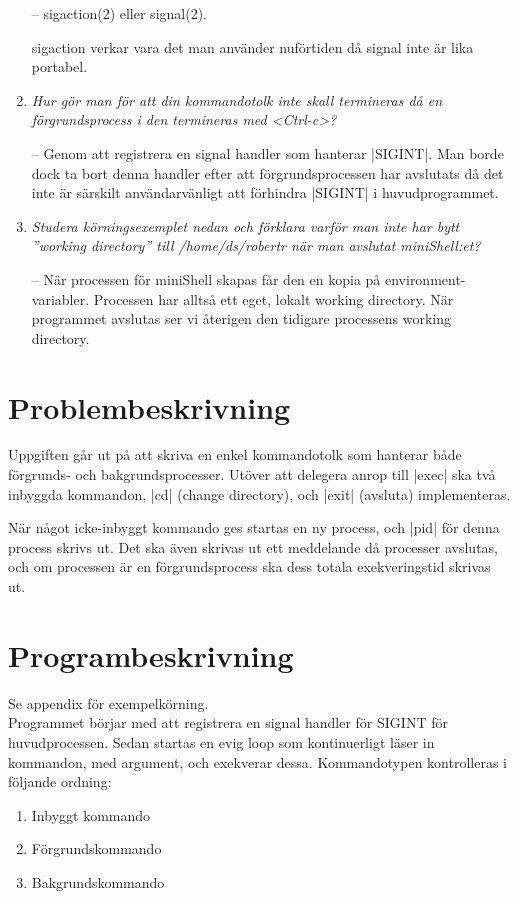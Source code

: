 \documentclass[paper=a4, fontsize=11pt]{scrartcl} %
\numberwithin{equation}{section} %
\numberwithin{figure}{section} %
\numberwithin{table}{section} %
\begin{document}
\begin{enumerate}[1)]
-- sigaction(2) eller signal(2).

sigaction verkar vara det man använder nuförtiden då signal inte är lika portabel.

\item
\emph{Hur gör man för att din kommandotolk inte skall termineras 
då en förgrundsprocess i den termineras med <Ctrl-c>?}

-- Genom att registrera en signal handler som hanterar |SIGINT|. 
Man borde dock ta bort denna handler efter att förgrundsprocessen har avslutats
då det inte är särskilt användarvänligt att förhindra |SIGINT| i huvudprogrammet.

\item
\emph{Studera körningsexemplet nedan och förklara varför man inte har bytt 
''working directory'' till /home/ds/robertr när man avslutat miniShell:et?}

-- När processen för miniShell skapas får den en kopia på environment-variabler. Processen har alltså ett eget, lokalt 
working directory. När programmet avslutas ser vi återigen den tidigare processens working directory.

\end{enumerate}

\section{Problembeskrivning}

Uppgiften går ut på att skriva en enkel kommandotolk 
som hanterar både förgrunds- och bakgrundsprocesser.
Utöver att delegera anrop till |exec| ska två inbyggda kommandon,
 |cd| (change directory), och |exit| (avsluta) implementeras.

När något icke-inbyggt kommando ges startas en ny process, och |pid| för denna process skrivs ut.
Det ska även skrivas ut ett meddelande då processer avslutas, och om processen är en förgrundsprocess ska dess totala exekveringstid skrivas ut.


\section{Programbeskrivning}

Se appendix för exempelkörning.\\

Programmet börjar med att registrera en signal handler för SIGINT för huvudprocessen.
Sedan startas en evig loop som kontinuerligt läser in kommandon, med argument, och exekverar dessa.
Kommandotypen kontrolleras i följande ordning:
\begin{enumerate}
\item{Inbyggt kommando}
\item{Förgrundskommando}
\item{Bakgrundskommando}
\end{enumerate}
\end{document}
